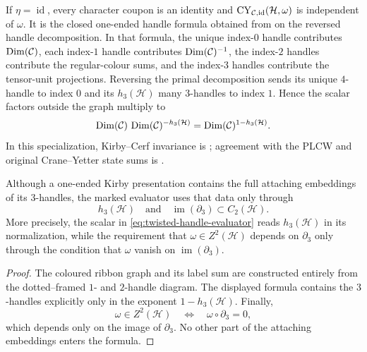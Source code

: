 \begin{remark}
\label{rem:identity-character-specialization}
If \(\eta=\operatorname{id}\), every character coupon is an identity and
\(\operatorname{CY}_{\mathcal{C},\operatorname{id}}(\mathcal H,\omega)\) is independent of
\(\omega\).  It is the closed one-ended handle formula obtained from
\cite[Definition~5.11]{Tham2021} on the reversed handle decomposition.
In that formula, the unique index-\(0\) handle contributes
\(\operatorname{Dim}(\mathcal{C})\), each index-\(1\) handle contributes
\(\operatorname{Dim}(\mathcal{C})^{-1}\), the index-\(2\) handles contribute the
regular-colour sums, and the index-\(3\) handles contribute the tensor-unit
projections.  Reversing the primal decomposition sends its unique
\(4\)-handle to index \(0\) and its \(h_3(\mathcal H)\) many \(3\)-handles
to index \(1\).  Hence the scalar factors outside the graph multiply to
\[
  \operatorname{Dim}(\mathcal{C})\,
  \operatorname{Dim}(\mathcal{C})^{-h_3(\mathcal H)}
  =\operatorname{Dim}(\mathcal{C})^{1-h_3(\mathcal H)}.
\]
In this specialization,
Kirby--Cerf invariance is \cite[Proposition~5.13]{Tham2021}; agreement with
the PLCW and original Crane--Yetter state sums is
\cite[Theorems~5.26 and~3.61]{Tham2021}.
\end{remark}
\begin{proposition}
\label{prop:evaluator-three-handle-dependence}
Although a one-ended Kirby presentation contains the full attaching embeddings
of its \(3\)-handles, the marked evaluator uses that data only through
\[
  h_3(\mathcal H)
  \quad\text{and}\quad
  \operatorname{im}(\partial_3)\subset C_2(\mathcal H).
\]
More precisely, the scalar in
\eqref{eq:twisted-handle-evaluator} reads \(h_3(\mathcal H)\) in its
normalization, while the requirement that
\(\omega\in Z^2(\mathcal H)\) depends on \(\partial_3\) only through the
condition that \(\omega\) vanish on \(\operatorname{im}(\partial_3)\).
\end{proposition}

\begin{proof}
The coloured ribbon graph and its label sum are constructed entirely from
the dotted--framed \(1\)- and \(2\)-handle diagram.  The displayed formula
contains the \(3\)-handles explicitly only in the exponent
\(1-h_3(\mathcal H)\).  Finally,
\[
  \omega\in Z^2(\mathcal H)
  \quad\Longleftrightarrow\quad
  \omega\circ\partial_3=0,
\]
which depends only on the image of \(\partial_3\).  No other part of the
attaching embeddings enters the formula.
\end{proof}

